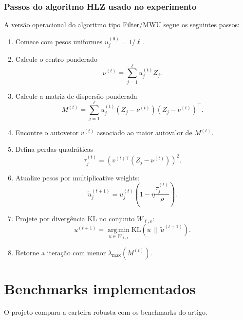 \documentclass[12pt,a4paper]{article}
\newcommand{\argmin}{\operatorname*{arg\,min}}
\begin{document}
\subsubsection{Passos do algoritmo HLZ usado no experimento}

A versão operacional do algoritmo tipo Filter/MWU segue os seguintes passos:

\begin{enumerate}[leftmargin=*]
  \item Comece com pesos uniformes $u_j^{(0)}=1/\ell$.
  \item Calcule o centro ponderado
  \begin{equation}
    \nu^{(t)} = \sum_{j=1}^{\ell} u_j^{(t)} Z_j.
  \end{equation}
  \item Calcule a matriz de dispersão ponderada
  \begin{equation}
    M^{(t)}
    =
    \sum_{j=1}^{\ell}
    u_j^{(t)}
    (Z_j-\nu^{(t)})(Z_j-\nu^{(t)})^\top.
  \end{equation}
  \item Encontre o autovetor $v^{(t)}$ associado ao maior autovalor de $M^{(t)}$.
  \item Defina perdas quadráticas
  \begin{equation}
    \tau_j^{(t)}
    =
    \left(v^{(t)\top}(Z_j-\nu^{(t)})\right)^2.
  \end{equation}
  \item Atualize pesos por multiplicative weights:
  \begin{equation}
    \tilde u_j^{(t+1)}
    =
    u_j^{(t)}
    \left(
      1-\eta\frac{\tau_j^{(t)}}{\rho}
    \right).
  \end{equation}
  \item Projete por divergência KL no conjunto $W_{\ell,\epsilon}$:
  \begin{equation}
    u^{(t+1)}
    =
    \argmin_{u\in W_{\ell,\epsilon}}
    \mathrm{KL}(u\,\|\,\tilde u^{(t+1)}).
  \end{equation}
  \item Retorne a iteração com menor $\lambda_{\max}(M^{(t)})$.
\end{enumerate}

\section{Benchmarks implementados}

O projeto compara a carteira robusta com os benchmarks do artigo.
\end{document}
